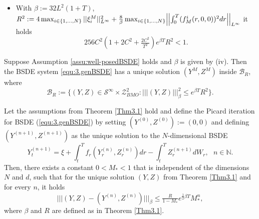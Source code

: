 \documentclass[10pt,a4paper]{amsart}
\newcommand{\trinm}[1]{\vert\!\vert\!\vert #1 \vert\!\vert\!\vert}
\begin{document}
\begin{Assumption}
\begin{itemize}
\item[\textnormal{(iv)}] With $\beta := 32L^{2}(1+T)$, $R^{2}:= 4\max_{i \in \{1,...,N\}}||\xi_{i}^{M}||_{L^{\infty}}^{2} + \tfrac{8}{\beta}\max_{i \in \{1,...,N\}}\Bigl|\Bigl|\int_{0}^{T}(f_{M}^{i}(r,0,0))^{2}dr\Bigr|\Bigr|_{L^{\infty}}$ it holds
\[
256C^{2}(1+2C^{2}+\tfrac{2C^{2}}{T^{2}})e^{\beta T}R^{2} < 1.
\]

\end{itemize}

\end{Assumption}

\begin{Theorem}
\label{Thm3.1}
Suppose Assumption \ref{assu:well-posedBSDE} holds and $\beta$ is given by \textnormal{(iv)}. Then the BSDE system \eqref{equ:3.genBSDE} has a unique solution $(Y^{M},Z^{M})$ inside $\mathcal{B}_{R}$, where  
\[
\mathcal{B}_{R} := \bigl\{(Y,Z) \in \mathcal{S}^{\infty} \times \mathcal{Z}_{BMO}^{2} : \trinm{(Y,Z)}_\beta^{2} \leq e^{\beta T}R^{2} \bigr\}.
\]
\end{Theorem}

\begin{Corollary}
\label{Cor3.3}
Let the assumptions from Theorem \ref{Thm3.1} hold and define the Picard iteration for BSDE \textnormal{(\ref{equ:3.genBSDE})} by setting $(Y^{(0)},Z^{(0)}):= (0,0)$ and defining $(Y^{(n+1)},Z^{(n+1)})$ as the unique solution to the $N$-dimensional BSDE
\[
Y_{t}^{(n+1)} = \xi + \int_{t}^{T}f_{r}(Y_{r}^{(n)},Z_{r}^{(n)})dr - \int_{t}^{T}Z_{r}^{(n+1)}dW_{r},\ \ \ n \in \mathbb{N}.
\]
Then, there exists a constant $0<M_{*}< 1$ that is independent of the dimensions $N$ and $d$, such that for the unique solution $(Y,Z)$ from Theorem \ref{Thm3.1} and for every $n$, it holds
\begin{equation}
\label{NdimPicard}
\trinm{(Y,Z)-(Y^{(n)},Z^{(n)}) }_\beta  \leq \tfrac{R}{1-M_{*}}e^{\tfrac{1}{2}\beta T}M_{*}^{n},
\end{equation}
where $\beta$ and $R$ are defined as in Theorem \ref{Thm3.1}.
\end{Corollary}
\end{document}
